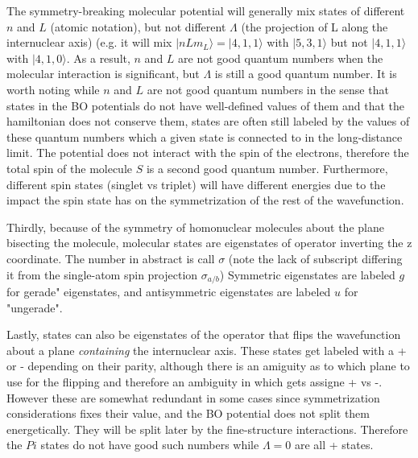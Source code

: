 \documentclass[prl, longbibliography]{revtex4-2}
\begin{document}
The symmetry-breaking molecular potential will generally mix states of different $n$ and $L$ (atomic notation), but not different $\Lambda$ (the projection of L along the internuclear axis) (e.g. it will mix $|nLm_L\rangle=|4,1,1\rangle$ with $|5,3,1\rangle$ but not $|4,1,1\rangle$ with $|4,1,0\rangle$. 
As a result, $n$ and $L$ are not good quantum numbers when the molecular interaction is significant, but $\Lambda$ is still a good quantum number. 
It is worth noting while $n$ and $L$ are not good quantum numbers in the sense that states in the BO potentials do not have well-defined values of them and that the hamiltonian does not conserve them, states are often still labeled by the values of these quantum numbers which a given state is connected to in the long-distance limit.
The potential does not interact with the spin of the electrons, therefore the total spin of the molecule $S$ is a second good quantum number. Furthermore, different spin states (singlet vs triplet) will have different energies due to the impact the spin state has on the symmetrization of the rest of the wavefunction.

Thirdly, because of the symmetry of homonuclear molecules about the plane bisecting the molecule, molecular states are eigenstates of operator inverting the z coordinate. The number in abstract is call $\sigma$ (note the lack of subscript differing it from the single-atom spin projection $\sigma_{a/b}$) Symmetric eigenstates are labeled $g$ for gerade" eigenstates, and antisymmetric eigenstates are labeled $u$ for "ungerade".

Lastly, states can also be eigenstates of the operator that flips the wavefunction about a plane \emph{containing} the internuclear axis. These states get labeled with a + or - depending on their parity, although there is an amiguity as to which plane to use for the flipping and therefore an ambiguity in which gets assigne + vs -\cite{lefebvre-brion_perturbations_1986}. However these are somewhat redundant in some cases since symmetrization considerations fixes their value, and the BO potential does not split them energetically. They will be split later by the fine-structure interactions. Therefore the $Pi$ states do not have good such numbers while $\Lambda=0$ are all + states. 
\end{document}

